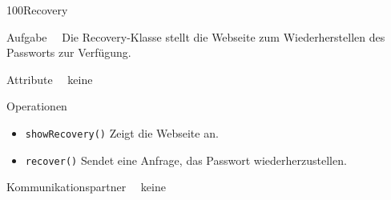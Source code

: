 \begin{class}{100}{Recovery}
\item[Aufgabe]~\
Die Recovery-Klasse stellt die Webseite zum Wiederherstellen des Passworts zur Verfügung.
\item[Attribute]~\ keine
\item[Operationen]~\
\begin{itemize}
    \item \texttt{showRecovery()} Zeigt die Webseite an.
    \item \texttt{recover()} Sendet eine Anfrage, das Passwort wiederherzustellen.
\end{itemize}
\item[Kommunikationspartner]~\ keine
\end{class}